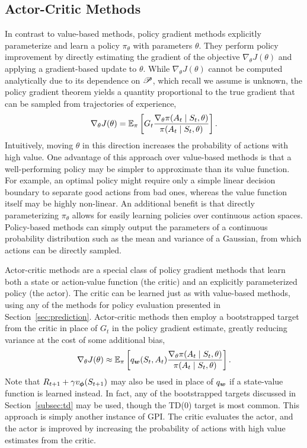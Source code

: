   \subsection{Actor-Critic Methods} 
  In contrast to value-based methods, policy gradient methods explicitly parameterize and learn a policy $\pi_\theta$ with parameters $\theta$. They perform policy improvement by directly estimating the gradient of the objective $\nabla_\theta J(\theta)$ and applying a gradient-based update to $\theta$. While $\nabla_\theta J(\theta)$ cannot be computed analytically due to its dependence on $\mathscr{P}$, which recall we assume is unknown, the policy gradient theorem  yields a quantity proportional to the true gradient that can be sampled from trajectories of experience,
  \begin{equation}
      \nabla_\theta J(\theta) = \operatorname{\mathbb{E}}_\pi \left[ G_t \frac{\nabla_\theta \pi(A_t \mid S_t, \theta)}{\pi(A_t \mid S_t, \theta)} \right].
      \label{eq:pg}
  \end{equation}
  Intuitively, moving $\theta$ in this direction increases the probability of actions with high value. One advantage of this approach over value-based methods is that a well-performing policy may be simpler to approximate than its value function. For example, an optimal policy might require only a simple linear decision boundary to separate good actions from bad ones, whereas the value function itself may be highly non-linear. An additional benefit is that directly parameterizing $\pi_\theta$ allows for easily learning policies over continuous action spaces. Policy-based methods can simply output the parameters of a continuous probability distribution such as the mean and variance of a Gaussian, from which actions can be directly sampled.
  
  Actor-critic methods are a special class of policy gradient methods that learn both a state or action-value function (the critic) and an explicitly parameterized policy (the actor). The critic can be learned just as with value-based methods, using any of the methods for policy evaluation presented in Section~\ref{sec:prediction}. Actor-critic methods then employ a bootstrapped target from the critic in place of $G_t$ in the policy gradient estimate, greatly reducing variance at the cost of some additional bias,
  \begin{equation}
      \nabla_\theta J(\theta) \approx \operatorname{\mathbb{E}}_\pi \left[ q_{\bm w}(S_t, A_t) \frac{\nabla_\theta \pi(A_t \mid S_t, \theta)}{\pi(A_t \mid S_t, \theta)} \right].
      \label{eq:pg_critic}
  \end{equation}
  Note that $R_{t+1} + \gamma v_{\bm \phi}(S_{t+1})$ may also be used in place of $q_{\bm w}$ if a state-value function is learned instead. In fact, any of the bootstrapped targets discussed in Section~\ref{subsec:td} may be used, though the TD(0) target is most common. This approach is simply another instance of GPI. The critic evaluates the actor, and the actor is improved by increasing the probability of actions with high value estimates from the critic. 
  
